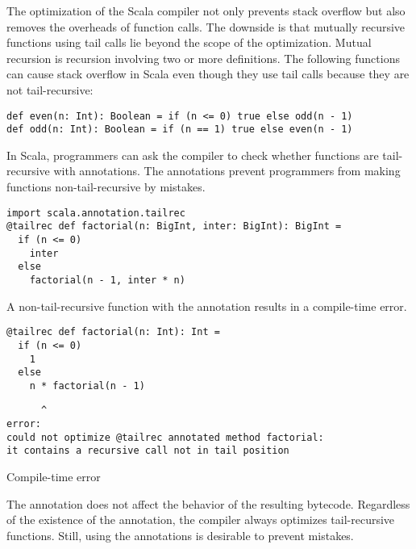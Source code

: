 The optimization of the Scala compiler not only prevents stack overflow but also removes the
overheads of function calls. The downside is that mutually recursive
functions using tail calls lie beyond the scope of the optimization.
Mutual recursion is recursion involving two or more definitions.
The following functions can cause stack overflow in Scala even though they use tail
calls because they are not tail-recursive:

\begin{verbatim}
def even(n: Int): Boolean = if (n <= 0) true else odd(n - 1)
def odd(n: Int): Boolean = if (n == 1) true else even(n - 1)
\end{verbatim}

In Scala, programmers can ask the compiler to check
whether functions are tail-recursive with annotations. The annotations prevent
programmers from making functions non-tail-recursive by mistakes.

\begin{verbatim}
import scala.annotation.tailrec
@tailrec def factorial(n: BigInt, inter: BigInt): BigInt =
  if (n <= 0)
    inter
  else
    factorial(n - 1, inter * n)
\end{verbatim}

A non-tail-recursive function with the  annotation results in a
compile-time error.

\begin{verbatim}
@tailrec def factorial(n: Int): Int =
  if (n <= 0)
    1
  else
    n * factorial(n - 1)
\end{verbatim}
\vspace{-1em}
\begin{mdframed}[hidealllines=true,backgroundcolor=red!10,innerleftmargin=3pt,innerrightmargin=3pt,leftmargin=-3pt,rightmargin=-3pt]
\begin{verbatim}
      ^
error:
could not optimize @tailrec annotated method factorial:
it contains a recursive call not in tail position
\end{verbatim}
\vspace{-1.5em}
\begin{flushright}
\scriptsize\textsf{Compile-time error}
\end{flushright}
\end{mdframed}

The annotation does not affect the behavior of the resulting bytecode.
Regardless of the existence of the annotation, the compiler always optimizes
tail-recursive functions. Still, using the annotations is desirable to prevent
mistakes.

